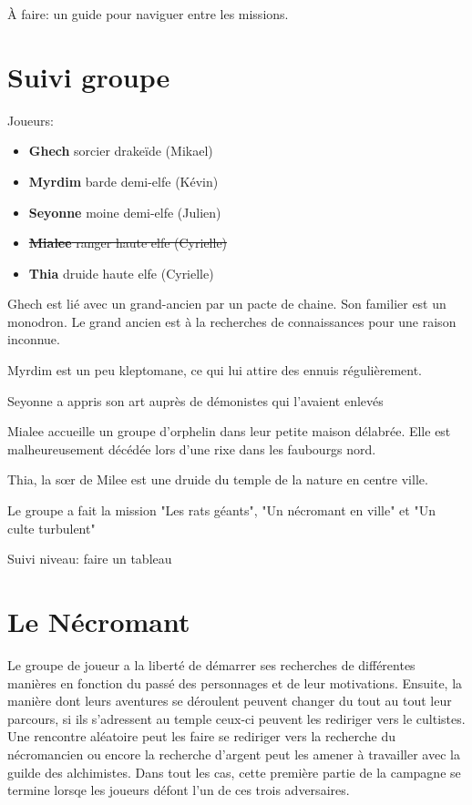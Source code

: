 
À faire: un guide pour naviguer entre les missions.

\section{Suivi groupe}

Joueurs:
\begin{itemize}
  \item {\bf Ghech} sorcier drakeïde (Mikael)
  \item {\bf Myrdim} barde demi-elfe (Kévin)
  \item {\bf Seyonne} moine demi-elfe (Julien)
  \item \sout{{\bf Mialee} ranger haute elfe (Cyrielle)}
  \item {\bf Thia} druide haute elfe (Cyrielle)
\end{itemize}

Ghech est lié avec un grand-ancien par un pacte de chaine. Son familier est un 
monodron. Le grand ancien est à la recherches de connaissances pour une raison
inconnue.

Myrdim est un peu kleptomane, ce qui lui attire des ennuis régulièrement.

Seyonne a appris son art auprès de démonistes qui l'avaient enlevés

Mialee accueille un groupe d'orphelin dans leur petite maison délabrée. Elle
est malheureusement décédée lors d'une rixe dans les faubourgs nord.

Thia, la s\oe{}r de Milee est une druide du temple de la nature en centre ville.

Le groupe a fait la mission "Les rats géants", "Un nécromant en ville" et "Un culte turbulent"

Suivi niveau: faire un tableau

\section{Le Nécromant}

Le groupe de joueur a la liberté de démarrer ses recherches de différentes manières en fonction
du passé des personnages et de leur motivations. Ensuite, la manière dont leurs aventures se déroulent
peuvent changer du tout au tout leur parcours, si ils s'adressent au temple ceux-ci peuvent les rediriger 
vers le cultistes. Une rencontre aléatoire peut les faire se rediriger vers la recherche du nécromancien 
ou encore la recherche d'argent peut les amener à travailler avec la guilde des alchimistes. Dans tout
les cas, cette première partie de la campagne se termine lorsqe les joueurs défont l'un de ces trois
adversaires.

